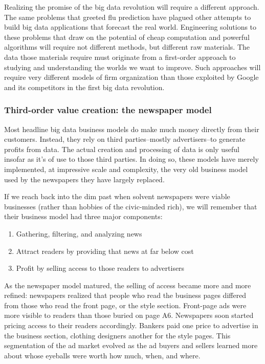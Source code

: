 \documentclass[12pt]{article}
\begin{document}
Realizing the promise of the big data revolution will require
a different approach. The same problems that greeted flu prediction
have plagued other attempts to build big data applications that
forecast the real world. Engineering solutions to these problems that
draw on the potential of cheap computation and powerful algorithms
will require not different methods, but different raw materials. The
data those materials require must originate from a first-order
approach to studying and understanding the worlds we want to
improve. Such approaches will require very different models of firm
organization than those exploited by Google and its competitors in the
first big data revolution.


\subsubsection{Third-order value creation: the newspaper model}
\label{sec:third-order-value}

Most headline big data business models do make much money directly from
their customers. Instead, they rely on third parties--mostly
advertisers--to generate profits from data. The actual creation and
processing of data is only useful insofar as it's of use to those
third parties. In doing so, these models have merely implemented, at
impressive scale and complexity, the very old business model used by
the newspapers they have largely replaced.

If we reach back into the dim past when solvent newspapers were viable
businesses (rather than hobbies of the civic-minded rich), we will
remember that their business model had three major components:

\begin{enumerate}
\item Gathering, filtering, and analyzing news
\item Attract readers by providing that news at far below cost
\item Profit by selling access to those readers to advertisers
\end{enumerate}

As the newspaper model matured, the selling of access became more and
more refined: newspapers realized that people who read the business
pages differed from those who read the front page, or the style
section. Front-page ads were more visible to readers than those buried
on page A6. Newspapers soon started pricing access to their readers
accordingly. Bankers paid one price to advertise in the business
section, clothing designers another for the style pages. This
segmentation of the ad market evolved as the ad buyers and sellers
learned more about whose eyeballs were worth how much, when, and
where.
\end{document}
